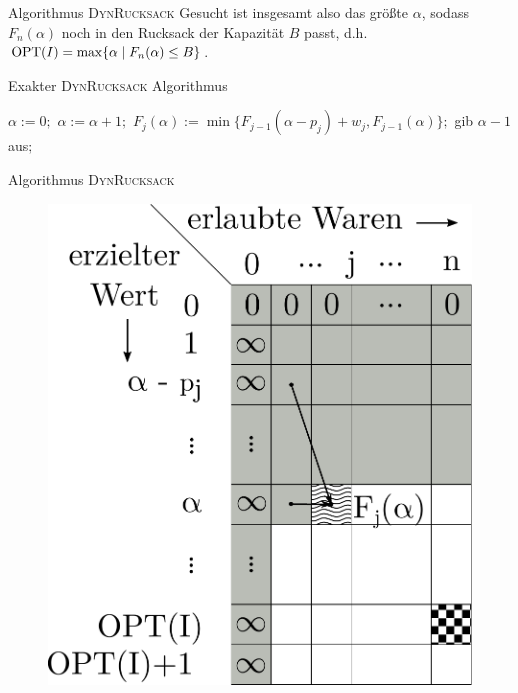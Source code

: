 \begin{frame}{Algorithmus \textsc{DynRucksack}}
    Gesucht ist insgesamt also das größte $\alpha$, sodass $F_n(\alpha)$ noch in den Rucksack der Kapazität $B$
    passt, d.h. $\operatorname{OPT}(I)=\max\{ \alpha \mid F_n(\alpha) \leq B \}$.
    
\begin{algorithm}[H]
    \caption{Exakter \textsc{DynRucksack} Algorithmus}
        \begin{algorithmic}
            \State $\alpha:=0;$
            \Repeat
            \State $\alpha:=\alpha+1;$
            \State $F_j(\alpha):=\min\{F_{j-1}(\alpha-p_j)+w_j,F_{j-1}(\alpha)\};$
            \EndFor
            \State gib $\alpha-1$ aus$;$
        \end{algorithmic}
\end{algorithm}
\end{frame}

\begin{frame}{Algorithmus \textsc{DynRucksack}}
    \begin{figure}[ht]
        \centering
        \includegraphics[height=0.75\textheight]{img/dynruck_tabelle.pdf}
    \end{figure}
\end{frame}


